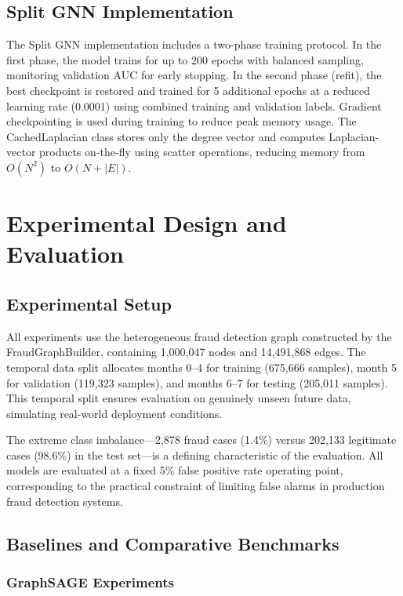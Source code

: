 \subsection{Split GNN Implementation}

The Split GNN implementation includes a two-phase training protocol. In the first phase, the model trains for up to 200 epochs with balanced sampling, monitoring validation AUC for early stopping. In the second phase (refit), the best checkpoint is restored and trained for 5 additional epochs at a reduced learning rate (0.0001) using combined training and validation labels. Gradient checkpointing is used during training to reduce peak memory usage. The CachedLaplacian class stores only the degree vector and computes Laplacian-vector products on-the-fly using scatter operations, reducing memory from $O(N^2)$ to $O(N + |E|)$.

\section{Experimental Design and Evaluation}

\subsection{Experimental Setup}

All experiments use the heterogeneous fraud detection graph constructed by the FraudGraphBuilder, containing 1,000,047 nodes and 14,491,868 edges. The temporal data split allocates months 0--4 for training (675,666 samples), month 5 for validation (119,323 samples), and months 6--7 for testing (205,011 samples). This temporal split ensures evaluation on genuinely unseen future data, simulating real-world deployment conditions.

The extreme class imbalance---2,878 fraud cases (1.4\%) versus 202,133 legitimate cases (98.6\%) in the test set---is a defining characteristic of the evaluation. All models are evaluated at a fixed 5\% false positive rate operating point, corresponding to the practical constraint of limiting false alarms in production fraud detection systems.

\subsection{Baselines and Comparative Benchmarks}

\subsubsection{GraphSAGE Experiments}

